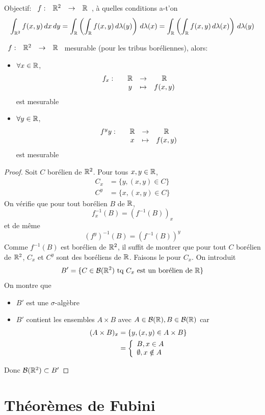 \documentclass[]{report}
\begin{document}
Objectif: $\begin{array}{ccccc} f : & \mathbb{R}^2 & \to & \mathbb{R} \end{array}$, à quelles conditions a-t'on
\[\int_{\mathbb{R}^2} f(x,y)\, dx\, dy=\int_{\mathbb{R}}\left(\int_{\mathbb{R}} f(x,y)\, d\lambda(y)\right)\, d\lambda(x)=\int_{\mathbb{R}}\left(\int_{\mathbb{R}} f(x,y)\, d\lambda(x)\right)\, d\lambda(y)\]

\begin{lm}{}{}
    $\begin{array}{ccccc} f : & \mathbb{R}^2 & \to & \mathbb{R} \end{array}$ mesurable (pour les tribus boréliennes), alors:
    \begin{itemize}
        \item $\forall x\in \mathbb{R}$,
              \[\begin{array}{ccccc} f_x : & & \mathbb{R} & \to & \mathbb{R} \\ & & y & \mapsto & f(x,y) \end{array}\]
              est mesurable
        \item $\forall y\in \mathbb{R}$,
              \[\begin{array}{ccccc} f^yy : & & \mathbb{R} & \to & \mathbb{R} \\ & & x & \mapsto & f(x,y) \end{array}\]
              est mesurable
    \end{itemize}
\end{lm}

\begin{proof}{}{}
    Soit $C$ borélien de $\mathbb{R}^2$. Pour tous $x,y\in \mathbb{R}$,
    \begin{align*}
        C_x & =\{y,(x,y)\in C\} \\
        C^y & =\{x,(x,y)\in C\}
    \end{align*}
    On vérifie que pour tout borélien $B$ de $\mathbb{R}$,
    \[f_x^{-1}(B)=\left(f^{-1}(B)\right)_x\]
    et de même
    \[(f^y)^{-1}(B)=\left(f^{-1}(B)\right)^y\]
    Comme $f^{-1}(B)$ est borélien de $\mathbb{R}^2$, il suffit de montrer que pour tout $C$ borélien de $\mathbb{R}^2$, $C_x$ et $C^y$ sont des boréliens de $\mathbb{R}$. Faisons le pour $C_x$. On introduit
    \[B'=\{C\in \mathcal{B}(\mathbb{R}^2)\text{ tq $C_x$ est un borélien de $\mathbb{R}$}\} \]
    On montre que
    \begin{itemize}
        \item $B'$ est une $\sigma$-algèbre
        \item $B'$ contient les ensembles $A\times B$ avec $A\in \mathcal{B}(\mathbb{R}),B\in \mathcal{B}(\mathbb{R})$ car
              \begin{align*}
                  (A\times B)_x & =\{y,(x,y)\in A\times B\}               \\
                                & =\left\{\begin{array}{ll} B,x\in A \\ \emptyset, x\notin A \end{array} \right.
              \end{align*}
    \end{itemize}
    Donc $\mathcal{B}(\mathbb{R}^2)\subset B'$
\end{proof}

\section{Théorèmes de Fubini}
\end{document}
